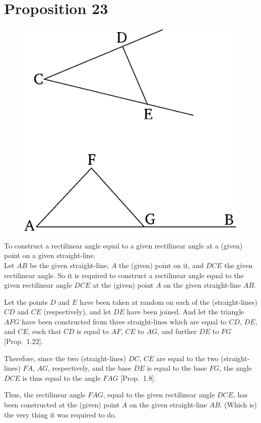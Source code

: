 \chapter*{Proposition 23}
\label{prop:23}

\begin{figure}[ht]
    \begin{center}
    \includegraphics[width=0.5\linewidth]{figures/fig23e.eps}
    \label{fig:prop_23}
    \end{center}
\end{figure}

To construct a rectilinear angle equal to a given rectilinear angle at a (given)
point on a given straight-line.\\

Let $AB$ be the given straight-line,  $A$ the (given) point on it, and 
$DCE$ the given rectilinear angle. So it is required to construct a rectilinear
angle equal to the given rectilinear angle $DCE$ at the (given) point
$A$ on the given straight-line
$AB$.

Let the points $D$ and $E$ have been taken at random on each
of the (straight-lines) $CD$ and $CE$ (respectively), and let $DE$ have been joined.
And let the triangle $AFG$ have been constructed from three straight-lines
which are equal to $CD$, $DE$, and $CE$, such that $CD$ is equal to $AF$,
$CE$ to $AG$, and further $DE$ to $FG$ [Prop.~1.22].

Therefore, since the two (straight-lines) $DC$, $CE$ are equal to the
two (straight-lines) $FA$, $AG$, respectively, and the base $DE$ is equal to
the base $FG$, the angle $DCE$ is thus equal to the angle $FAG$ [Prop.~1.8].

Thus, the rectilinear angle $FAG$,  equal to the  given
rectilinear angle $DCE$, has been constructed at the (given) point $A$ on the given straight-line $AB$.
(Which is) the very thing it was required to do.



